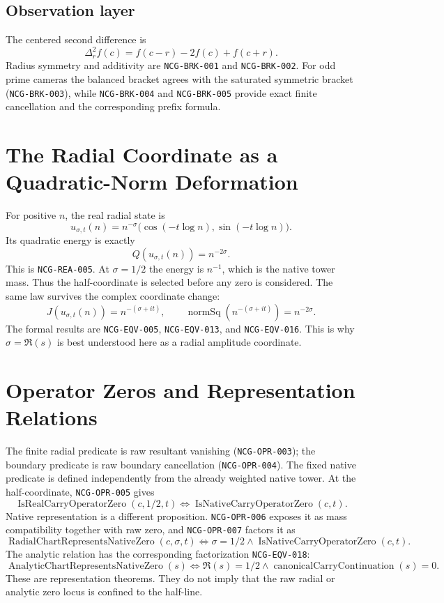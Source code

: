 \documentclass[11pt,a4paper]{article}
\newcommand{\normsq}{\operatorname{normSq}}
\begin{document}
\subsection{Observation layer}
The centered second difference is
\[ \Delta_r^2 f(c)=f(c-r)-2f(c)+f(c+r). \]
Radius symmetry and additivity are \texttt{NCG-BRK-001} and \texttt{NCG-BRK-002}. For odd prime cameras the balanced bracket agrees with the saturated symmetric bracket (\texttt{NCG-BRK-003}), while \texttt{NCG-BRK-004} and \texttt{NCG-BRK-005} provide exact finite cancellation and the corresponding prefix formula.
\section{The Radial Coordinate as a Quadratic-Norm Deformation}
For positive $n$, the real radial state is
\[ u_{\sigma,t}(n)=n^{-\sigma}\bigl(\cos(-t\log n),\sin(-t\log n)\bigr). \]
Its quadratic energy is exactly
\[ Q(u_{\sigma,t}(n))=n^{-2\sigma}. \]
This is \texttt{NCG-REA-005}. At $\sigma=1/2$ the energy is $n^{-1}$, which is the native tower mass. Thus the half-coordinate is selected before any zero is considered.
The same law survives the complex coordinate change:
\[ J(u_{\sigma,t}(n))=n^{-(\sigma+it)},\qquad 
\normsq(n^{-(\sigma+it)})=n^{-2\sigma}. \]
The formal results are \texttt{NCG-EQV-005}, \texttt{NCG-EQV-013}, and \texttt{NCG-EQV-016}. This is why $\sigma=\Re(s)$ is best understood here as a radial amplitude coordinate.
\section{Operator Zeros and Representation Relations}
The finite radial predicate is raw resultant vanishing (\texttt{NCG-OPR-003}); the boundary predicate is raw boundary cancellation (\texttt{NCG-OPR-004}). The fixed native predicate is defined independently from the already weighted native tower.
At the half-coordinate, \texttt{NCG-OPR-005} gives
\[ \operatorname{IsRealCarryOperatorZero}(c,1/2,t)\Longleftrightarrow \operatorname{IsNativeCarryOperatorZero}(c,t). \]
Native representation is a different proposition. \texttt{NCG-OPR-006} exposes it as mass compatibility together with raw zero, and \texttt{NCG-OPR-007} factors it as
\[ \operatorname{RadialChartRepresentsNativeZero}(c,\sigma,t)\Longleftrightarrow \sigma=1/2\land\operatorname{IsNativeCarryOperatorZero}(c,t). \]
The analytic relation has the corresponding factorization \texttt{NCG-EQV-018}:
\[ \operatorname{AnalyticChartRepresentsNativeZero}(s)\Longleftrightarrow \Re(s)=1/2\land\operatorname{canonicalCarryContinuation}(s)=0. \]
These are representation theorems. They do not imply that the raw radial or analytic zero locus is confined to the half-line.
\end{document}
